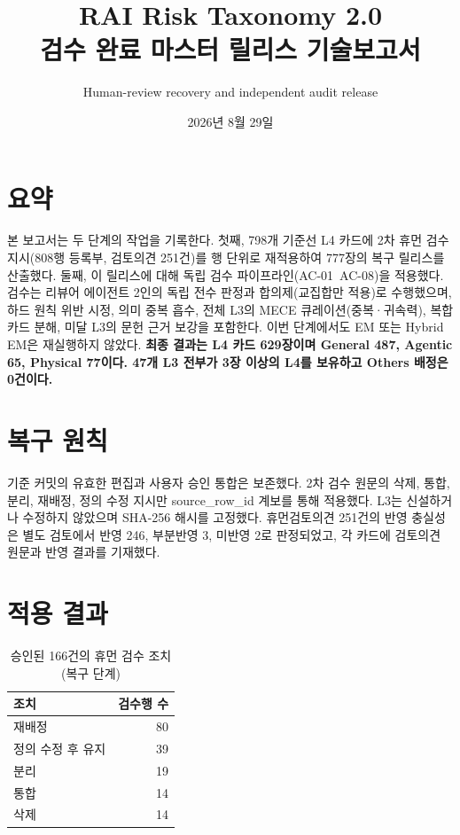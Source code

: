 \documentclass[11pt,a4paper]{article}
\begin{document}
\title{RAI Risk Taxonomy 2.0\\검수 완료 마스터 릴리스 기술보고서}\author{Human-review recovery and independent audit release}\date{2026년 8월 29일}\maketitle
\par\section*{요약}
본 보고서는 두 단계의 작업을 기록한다. 첫째, 798개 기준선 L4 카드에 2차 휴먼 검수 지시(808행 등록부, 검토의견 251건)를 행 단위로 재적용하여 777장의 복구 릴리스를 산출했다. 둘째, 이 릴리스에 대해 독립 검수 파이프라인(AC-01~AC-08)을 적용했다. 검수는 리뷰어 에이전트 2인의 독립 전수 판정과 합의제(교집합만 적용)로 수행했으며, 하드 원칙 위반 시정, 의미 중복 흡수, 전체 L3의 MECE 큐레이션(중복·귀속력), 복합 카드 분해, 미달 L3의 문헌 근거 보강을 포함한다. 이번 단계에서도 EM 또는 Hybrid EM은 재실행하지 않았다. \textbf{최종 결과는 L4 카드 629장이며 General 487, Agentic 65, Physical 77이다. 47개 L3 전부가 3장 이상의 L4를 보유하고 Others 배정은 0건이다.}
\par\section{복구 원칙}
기준 커밋의 유효한 편집과 사용자 승인 통합은 보존했다. 2차 검수 원문의 삭제, 통합, 분리, 재배정, 정의 수정 지시만 source\_row\_id 계보를 통해 적용했다. L3는 신설하거나 수정하지 않았으며 SHA-256 해시를 고정했다. 휴먼검토의견 251건의 반영 충실성은 별도 검토에서 반영 246, 부분반영 3, 미반영 2로 판정되었고, 각 카드에 검토의견 원문과 반영 결과를 기재했다.
\par\section{적용 결과}
\begin{table}[h]\centering\begin{tabular}{lr}\toprule 조치 & 검수행 수\\\midrule 재배정 & 80\\정의 수정 후 유지 & 39\\분리 & 19\\통합 & 14\\삭제 & 14\\\bottomrule\end{tabular}\caption{승인된 166건의 휴먼 검수 조치(복구 단계)}\end{table}
\end{document}

